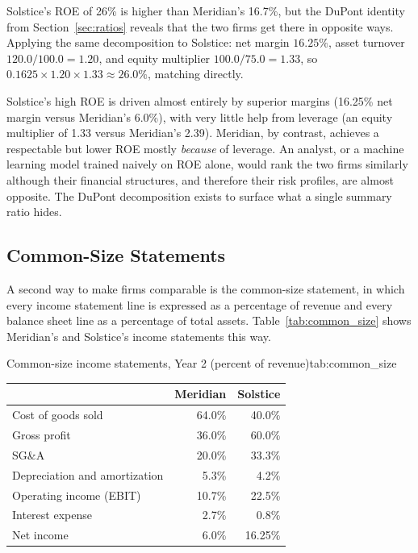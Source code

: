 \documentclass[../ai_in_finance]{subfiles}
\begin{document}
Solstice's ROE of 26\% is higher than Meridian's 16.7\%, but the DuPont identity from Section~\ref{sec:ratios} reveals that the two firms get there in opposite ways. Applying the same decomposition to Solstice: net margin $16.25\%$, asset turnover $120.0/100.0 = 1.20$, and equity multiplier $100.0/75.0 = 1.33$, so $0.1625 \times 1.20 \times 1.33 \approx 26.0\%$, matching directly.

Solstice's high ROE is driven almost entirely by superior margins (16.25\% net margin versus Meridian's 6.0\%), with very little help from leverage (an equity multiplier of 1.33 versus Meridian's 2.39). Meridian, by contrast, achieves a respectable but lower ROE mostly \emph{because} of leverage. An analyst, or a machine learning model trained naively on ROE alone, would rank the two firms similarly although their financial structures, and therefore their risk profiles, are almost opposite. The DuPont decomposition exists to surface what a single summary ratio hides.

\subsection{Common-Size Statements}

A second way to make firms comparable is the common-size statement, in which every income statement line is expressed as a percentage of revenue and every balance sheet line as a percentage of total assets. Table~\ref{tab:common_size} shows Meridian's and Solstice's income statements this way.

\begin{booktable}[htbp]{Common-size income statements, Year 2 (percent of revenue)}{tab:common_size}
\begin{tabular}{lrr}
\toprule
 & Meridian & Solstice \\
\midrule
Cost of goods sold & 64.0\% & 40.0\% \\
Gross profit & 36.0\% & 60.0\% \\
SG\&A & 20.0\% & 33.3\% \\
Depreciation and amortization & 5.3\% & 4.2\% \\
Operating income (EBIT) & 10.7\% & 22.5\% \\
Interest expense & 2.7\% & 0.8\% \\
Net income & 6.0\% & 16.25\% \\
\bottomrule
\end{tabular}
\end{booktable}
\end{document}

